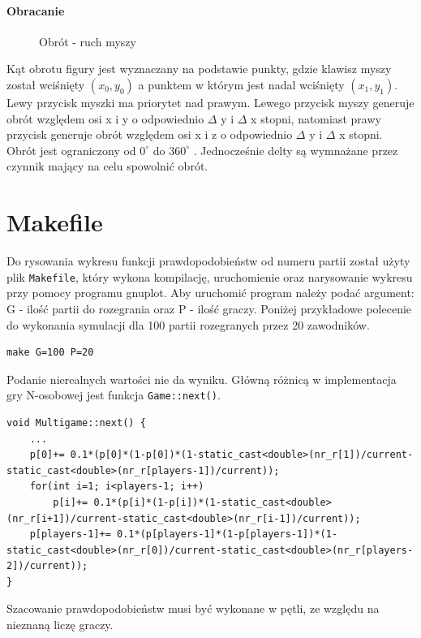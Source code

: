 \paragraph{Obracanie}
\begin{figure}
    \centering
    \caption{Obrót - ruch myszy}
	\label{fig:obrot} 
\end{figure}
Kąt obrotu figury jest wyznaczany na podstawie punkty, gdzie klawisz myszy został wciśnięty $(x_0,y_0)$ a punktem w którym jest nadal wciśnięty $(x_1,y_1)$.
Lewy przycisk myszki ma priorytet nad prawym. Lewego przycisk myszy generuje obrót względem osi x i y o odpowiednio $\Delta$ y i $\Delta$ x stopni, natomiast prawy przycisk generuje obrót względem osi x i z o odpowiednio $\Delta$ y i $\Delta$ x stopni. Obrót jest ograniczony od $0^\circ$ do $360^\circ$ . Jednocześnie delty są wymnażane przez czynnik mający na celu spowolnić obrót.



\section{Makefile}
\label{sec::makefile}
Do rysowania wykresu funkcji prawdopodobieństw od numeru partii został użyty plik \texttt{Makefile}, który wykona kompilację, uruchomienie oraz narysowanie wykresu przy pomocy programu gnuplot. Aby uruchomić program należy podać argument: G - ilość partii do rozegrania oraz P - ilość graczy. Poniżej przykładowe polecenie do wykonania symulacji dla 100 partii rozegranych przez 20 zawodników.
\begin{verbatim}
make G=100 P=20
\end{verbatim}
Podanie nierealnych wartości nie da wyniku. Główną różnicą w implementacja gry N-osobowej jest funkcja \texttt{Game::next()}.
\begin{lstlisting}
void Multigame::next() {
    ...
    p[0]+= 0.1*(p[0]*(1-p[0])*(1-static_cast<double>(nr_r[1])/current-static_cast<double>(nr_r[players-1])/current));
    for(int i=1; i<players-1; i++)
        p[i]+= 0.1*(p[i]*(1-p[i])*(1-static_cast<double>(nr_r[i+1])/current-static_cast<double>(nr_r[i-1])/current));
    p[players-1]+= 0.1*(p[players-1]*(1-p[players-1])*(1-static_cast<double>(nr_r[0])/current-static_cast<double>(nr_r[players-2])/current));
}
\end{lstlisting}
Szacowanie prawdopodobieństw musi być wykonane w pętli, ze względu na nieznaną liczę graczy.